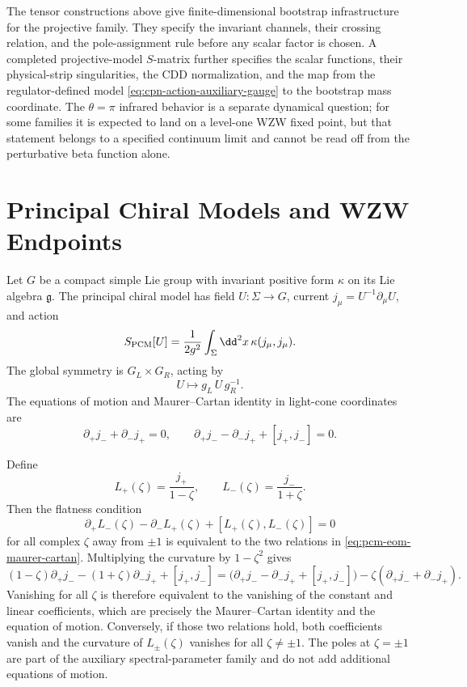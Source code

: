 \begin{remark}
\label{ca:cpn-exact-scattering-status}
The tensor constructions above give finite-dimensional bootstrap
infrastructure for the projective family.  They specify the invariant channels,
their crossing relation, and the pole-assignment rule before any scalar
factor is chosen.  A completed projective-model \(S\)-matrix further specifies
the scalar functions, their physical-strip singularities, the CDD
normalization, and the map from the regulator-defined model
\eqref{eq:cpn-action-auxiliary-gauge} to the bootstrap mass coordinate.  The
\(\theta=\pi\) infrared behavior is a separate dynamical question; for some
families it is expected to land on a level-one WZW fixed point, but that
statement belongs to a specified continuum limit and cannot be read off from
the perturbative beta function alone.
\end{remark}

\section{Principal Chiral Models and WZW Endpoints}
\label{sec:integrable-pcm-wzw-family}

Let \(G\) be a compact simple Lie group with invariant positive form
\(\kappa\) on its Lie algebra \(\mathfrak g\).  The principal chiral model has
field \(U:\Sigma\to G\), current \(j_\mu=U^{-1}\partial_\mu U\), and action
\begin{equation}
  S_{\rm PCM}[U]
  =
  \frac1{2g^2}\int_\Sigma\dd^2x\,\kappa(j_\mu,j_\mu).
  \label{eq:pcm-action}
\end{equation}
The global symmetry is \(G_L\times G_R\), acting by
\[
  U\mapsto g_L\,U\,g_R^{-1}.
\]
The equations of motion and Maurer--Cartan identity in light-cone coordinates
are
\begin{equation}
  \partial_+j_-+\partial_-j_+=0,
  \qquad
  \partial_+j_- -\partial_-j_+ +[j_+,j_-]=0 .
  \label{eq:pcm-eom-maurer-cartan}
\end{equation}

Define
\begin{equation}
  L_+(\zeta)=\frac{j_+}{1-\zeta},\qquad
  L_-(\zeta)=\frac{j_-}{1+\zeta}.
  \label{eq:pcm-lax-pair}
\end{equation}
Then the flatness condition
\[
  \partial_+L_-(\zeta)-\partial_-L_+(\zeta)+[L_+(\zeta),L_-(\zeta)]=0
\]
for all complex \(\zeta\) away from \(\pm1\) is equivalent to the two
relations in \eqref{eq:pcm-eom-maurer-cartan}.
Multiplying the curvature by \(1-\zeta^2\) gives
\[
  (1-\zeta)\partial_+j_-
  -(1+\zeta)\partial_-j_+
  +[j_+,j_-]
  =
  \bigl(\partial_+j_- -\partial_-j_+ +[j_+,j_-]\bigr)
  -\zeta(\partial_+j_-+\partial_-j_+).
\]
Vanishing for all \(\zeta\) is therefore equivalent to the vanishing of the
constant and linear coefficients, which are precisely the Maurer--Cartan
identity and the equation of motion.  Conversely, if those two relations hold,
both coefficients vanish and the curvature of \(L_\pm(\zeta)\) vanishes for
all \(\zeta\neq\pm1\).  The poles at \(\zeta=\pm1\) are part of the auxiliary
spectral-parameter family and do not add additional equations of motion.

